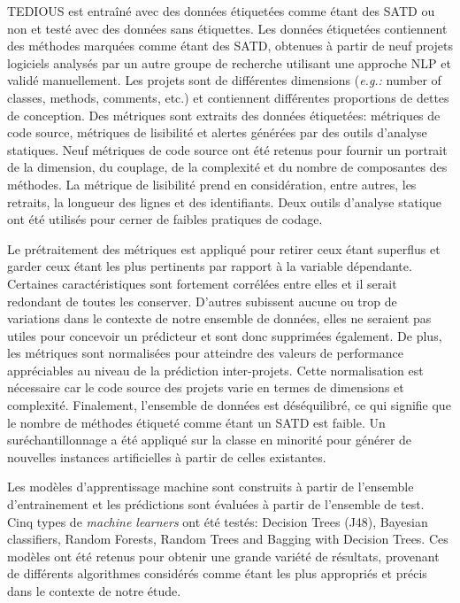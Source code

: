 \ac{TEDIOUS} est entra\^{i}n\'{e} avec des donn\'{e}es \'{e}tiquet\'{e}es comme \'{e}tant des \ac{SATD} ou non et test\'{e} avec des donn\'{e}es sans \'{e}tiquettes. Les donn\'{e}es \'{e}tiquet\'{e}es contiennent des m\'{e}thodes marqu\'{e}es comme \'{e}tant des \ac{SATD}, obtenues \`{a} partir de neuf projets logiciels analys\'{e}s par un autre groupe de recherche utilisant une approche \ac{NLP} et valid\'{e} manuellement. Les projets sont de diff\'{e}rentes dimensions (\emph{e.g.:} number of classes, methods, comments, etc.) et contiennent diff\'{e}rentes proportions de dettes de conception. Des m\'{e}triques sont extraits des donn\'{e}es \'{e}tiquet\'{e}es: m\'{e}triques de code source, m\'{e}triques de lisibilit\'{e} et alertes g\'{e}n\'{e}r\'{e}es par des outils d'analyse statiques. Neuf m\'{e}triques de code source ont \'{e}t\'{e} retenus pour fournir un portrait de la dimension, du couplage, de la complexit\'{e} et du nombre de composantes des m\'{e}thodes. La m\'{e}trique de lisibilit\'{e} prend en consid\'{e}ration, entre autres, les retraits, la longueur des lignes et des identifiants. Deux outils d'analyse statique ont \'{e}t\'{e} utilis\'{e}s pour cerner de faibles pratiques de codage. \par

Le pr\'{e}traitement des m\'{e}triques est appliqu\'{e} pour retirer ceux \'{e}tant superflus et garder ceux \'{e}tant les plus pertinents par rapport \`{a} la variable d\'{e}pendante. Certaines caract\'{e}ristiques sont fortement corr\'{e}l\'{e}es entre elles et il serait redondant de toutes les conserver. D'autres subissent aucune ou trop de variations dans le contexte de notre ensemble de donn\'{e}es, elles ne seraient pas utiles pour concevoir un pr\'{e}dicteur et sont donc supprim\'{e}es \'{e}galement. De plus, les m\'{e}triques sont normalis\'{e}es pour atteindre des valeurs de performance appr\'{e}ciables au niveau de la pr\'{e}diction inter-projets. Cette normalisation est n\'{e}cessaire car le code source des projets varie en termes de dimensions et complexit\'{e}. Finalement, l'ensemble de donn\'{e}es est d\'{e}s\'{e}quilibr\'{e}, ce qui signifie que le nombre de m\'{e}thodes \'{e}tiquet\'{e} comme \'{e}tant un \ac{SATD} est faible. Un sur\'{e}chantillonnage a \'{e}t\'{e} appliqu\'{e} sur la classe en minorit\'{e} pour g\'{e}n\'{e}rer de nouvelles instances artificielles \`{a} partir de celles existantes. \par

Les mod\`{e}les d'apprentissage machine sont construits \`{a} partir de l'ensemble d'entrainement et les pr\'{e}dictions sont \'{e}valu\'{e}es \`{a} partir de l'ensemble de test. Cinq types de \emph{machine learners} ont \'{e}t\'{e} test\'{e}s: Decision Trees (J48), Bayesian classifiers, Random Forests, Random Trees and Bagging with Decision Trees. Ces mod\`{e}les ont \'{e}t\'{e} retenus pour obtenir une grande vari\'{e}t\'{e} de r\'{e}sultats, provenant de diff\'{e}rents algorithmes consid\'{e}r\'{e}s comme \'{e}tant les plus appropri\'{e}s et pr\'{e}cis dans le contexte de notre \'{e}tude. \par

